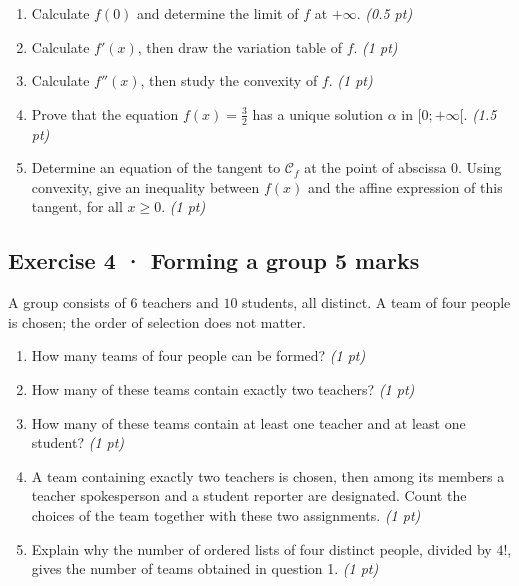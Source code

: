 \begin{enumerate}

\item Calculate $f(0)$ and determine the limit of $f$ at $+\infty$. \hfill\textit{(0.5 pt)}

\item Calculate $f'(x)$, then draw the variation table of $f$. \hfill\textit{(1 pt)}

\item Calculate $f''(x)$, then study the convexity of $f$. \hfill\textit{(1 pt)}

\item Prove that the equation $f(x)=\frac{3}{2}$ has a unique solution $\alpha$ in $[0;+\infty[$. \hfill\textit{(1.5 pt)}

\item Determine an equation of the tangent to $\mathcal C_f$ at the point of abscissa $0$. Using convexity, give an inequality between $f(x)$ and the affine expression of this tangent, for all $x\ge0$. \hfill\textit{(1 pt)}

\end{enumerate}

\subsection*{Exercise 4 · Forming a group \hfill 5 marks}A group consists of $6$ teachers and $10$ students, all distinct. A team of four people is chosen; the order of selection does not matter.

\begin{enumerate}

\item How many teams of four people can be formed? \hfill\textit{(1 pt)}

\item How many of these teams contain exactly two teachers? \hfill\textit{(1 pt)}

\item How many of these teams contain at least one teacher and at least one student? \hfill\textit{(1 pt)}

\item A team containing exactly two teachers is chosen, then among its members a teacher spokesperson and a student reporter are designated. Count the choices of the team together with these two assignments. \hfill\textit{(1 pt)}

\item Explain why the number of ordered lists of four distinct people, divided by $4!$, gives the number of teams obtained in question 1. \hfill\textit{(1 pt)}

\end{enumerate}

